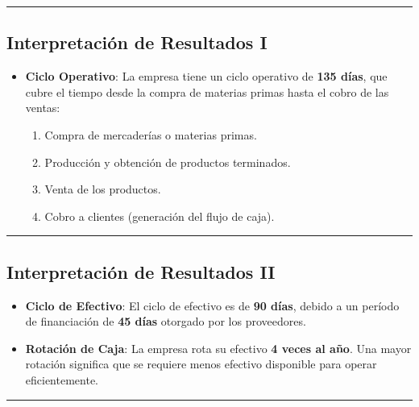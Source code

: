 \documentclass[
  letterpaper,
  DIV=11,
  numbers=noendperiod]{scrartcl}
\providecommand{\tightlist}{%
  \setlength{\itemsep}{0pt}\setlength{\parskip}{0pt}}\usepackage{longtable,booktabs,array}
\begin{document}
\begin{center}\rule{0.5\linewidth}{0.5pt}\end{center}

\subsection{Interpretación de Resultados
I}\label{interpretaciuxf3n-de-resultados-i}

\begin{itemize}
\tightlist
\item
  \textbf{Ciclo Operativo}: La empresa tiene un ciclo operativo de
  \textbf{135 días}, que cubre el tiempo desde la compra de materias
  primas hasta el cobro de las ventas:

  \begin{enumerate}
  \def\labelenumi{\arabic{enumi}.}
  \tightlist
  \item
    Compra de mercaderías o materias primas.
  \item
    Producción y obtención de productos terminados.
  \item
    Venta de los productos.
  \item
    Cobro a clientes (generación del flujo de caja).
  \end{enumerate}
\end{itemize}

\begin{center}\rule{0.5\linewidth}{0.5pt}\end{center}

\subsection{Interpretación de Resultados
II}\label{interpretaciuxf3n-de-resultados-ii}

\begin{itemize}
\tightlist
\item
  \textbf{Ciclo de Efectivo}: El ciclo de efectivo es de \textbf{90
  días}, debido a un período de financiación de \textbf{45 días}
  otorgado por los proveedores.
\item
  \textbf{Rotación de Caja}: La empresa rota su efectivo \textbf{4 veces
  al año}. Una mayor rotación significa que se requiere menos efectivo
  disponible para operar eficientemente.
\end{itemize}

\begin{center}\rule{0.5\linewidth}{0.5pt}\end{center}
\end{document}
